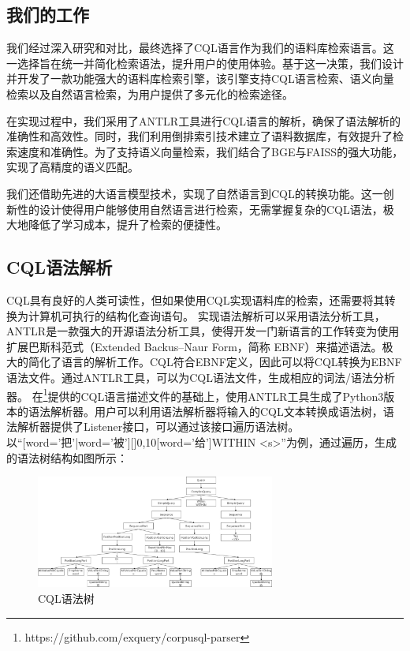 \documentclass[11pt]{article}
\begin{document}
\begin{CJK*}{UTF8}{gbsn}
\section{我们的工作}

我们经过深入研究和对比，最终选择了CQL语言作为我们的语料库检索语言。这一选择旨在统一并简化检索语法，提升用户的使用体验。基于这一决策，我们设计并开发了一款功能强大的语料库检索引擎，该引擎支持CQL语言检索、语义向量检索以及自然语言检索，为用户提供了多元化的检索途径。

在实现过程中，我们采用了ANTLR工具进行CQL语言的解析，确保了语法解析的准确性和高效性。同时，我们利用倒排索引技术建立了语料数据库，有效提升了检索速度和准确性。为了支持语义向量检索，我们结合了BGE与FAISS的强大功能，实现了高精度的语义匹配。

我们还借助先进的大语言模型技术，实现了自然语言到CQL的转换功能。这一创新性的设计使得用户能够使用自然语言进行检索，无需掌握复杂的CQL语法，极大地降低了学习成本，提升了检索的便捷性。

\subsection{CQL语法解析}

CQL具有良好的人类可读性，但如果使用CQL实现语料库的检索，还需要将其转换为计算机可执行的结构化查询语句。
实现语法解析可以采用语法分析工具，ANTLR是一款强大的开源语法分析工具，使得开发一门新语言的工作转变为使用扩展巴斯科范式（Extended Backus–Naur Form，简称 EBNF）来描述语法。极大的简化了语言的解析工作。CQL符合EBNF定义，因此可以将CQL转换为EBNF语法文件。通过ANTLR工具，可以为CQL语法文件，生成相应的词法/语法分析器。
在\footnote[1]{https://github.com/exquery/corpusql-parser}提供的CQL语言描述文件的基础上，使用ANTLR工具生成了Python3版本的语法解析器。用户可以利用语法解析器将输入的CQL文本转换成语法树，语法解析器提供了Listener接口，可以通过该接口遍历语法树。
以“[word='把'|word='被'][]{0,10}[word='给']WITHIN <s>”为例，通过遍历，生成的语法树结构如图所示：

\begin{figure}[h]
	\centering
	\includegraphics[width=0.7\textwidth]{cql-tree.jpg}
	\caption{CQL语法树}
	\label{fig:example}
\end{figure}


\end{CJK*}
\end{document}
